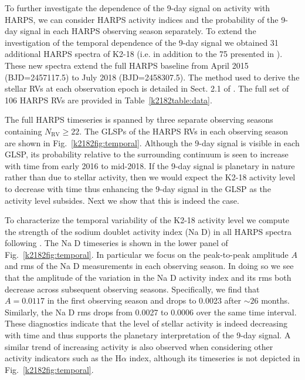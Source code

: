 To further investigate the dependence of the 9-day signal on activity with HARPS, we can consider HARPS activity
indices and the probability of the 9-day signal in each HARPS observing season separately.
To extend the investigation of the temporal dependence of the 9-day signal we obtained 31 additional HARPS
spectra of K2-18 (i.e. in addition to the 75 presented in ).
These new spectra extend the full HARPS baseline from April 2015 (BJD=2457117.5) to July 2018
(BJD=2458307.5). The method used to derive the stellar RVs at each observation epoch is detailed
in Sect. 2.1 of . The full set of 106 HARPS RVs are provided in Table~\ref{k2182table:data}.

The full HARPS timeseries is spanned by three separate observing seasons
containing $N_{\text{RV}} \geq 22$. The GLSPs of the HARPS RVs in each observing season are shown in
Fig.~\ref{k2182fig:temporal}. Although the 9-day signal is visible in each GLSP, its probability relative to the
surrounding continuum is seen to increase with time from early 2016 to mid-2018.
If the 9-day signal is planetary in nature rather than 
due to stellar activity, then we would expect the K2-18 activity level to decrease with time thus enhancing the 9-day signal in the GLSP as the activity level subsides. Next we  show that this is indeed the case.

To characterize the temporal variability of the K2-18 activity level we compute the strength of the sodium doublet
activity index (Na D) in all HARPS spectra following \cite{astudillodefru17b}. The Na D timeseries is shown in the lower
panel of Fig.~\ref{k2182fig:temporal}. In particular we focus on the peak-to-peak amplitude $A$ and rms of the Na D measurements in each
observing season. In doing so we see that the amplitude of
the variation in the Na D activity index and its rms both decrease across subsequent observing seasons. Specifically, we find that
$A=0.0117$ in the first observing season and drops to 0.0023 after $\sim 26$ months. Similarly, the Na D rms drops from 0.0027
to 0.0006 over the same time interval. These diagnostics indicate that 
the level of stellar activity is indeed decreasing with time and thus supports the planetary interpretation of the 9-day signal.
A similar trend of increasing activity is also observed when considering other activity
indicators such as the H$\alpha$ index, although its timeseries is not depicted in Fig.~\ref{k2182fig:temporal}.

